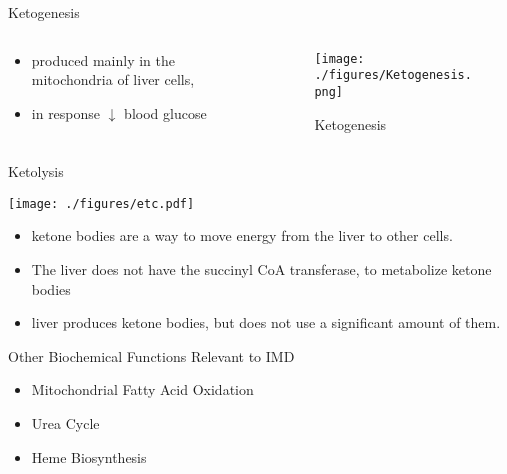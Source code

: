 \documentclass[presentation, smaller]{beamer}
\begin{document}
\begin{frame}[label={sec:orgcc37d0b}]{Ketogenesis}
\begin{columns}
\begin{column}{0.5\columnwidth}
\begin{itemize}
\item produced mainly in the mitochondria of liver cells,
\item in response \(\downarrow\) blood glucose
\end{itemize}
\end{column}

\begin{column}{0.5\columnwidth}
\begin{figure}[htbp]
\centering
\texttt{[image: ./figures/Ketogenesis.png]}
\caption[keto]{\label{fig:orgf907556}
Ketogenesis}
\end{figure}
\end{column}
\end{columns}
\end{frame}


\begin{frame}[label={sec:orge913b79}]{Ketolysis}
\begin{center}
\texttt{[image: ./figures/etc.pdf]}
\end{center}

\begin{itemize}
\item ketone bodies are a way to move energy from the liver to other cells.
\item The liver does not have the succinyl CoA transferase, to metabolize ketone bodies
\item liver produces ketone bodies, but does not use a significant amount of them.
\end{itemize}
\end{frame}

\begin{frame}[label={sec:orge52cfe9}]{Other Biochemical Functions Relevant to IMD}
\begin{itemize}
\item Mitochondrial Fatty Acid Oxidation

\item Urea Cycle

\item Heme Biosynthesis
\end{itemize}
\end{frame}
\end{document}
